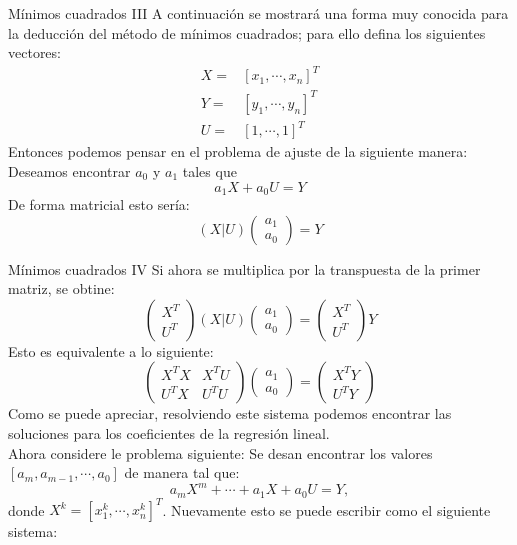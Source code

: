\begin{frame}{Mínimos cuadrados III}
\indent A continuación se mostrará una forma muy conocida para la deducción del método de mínimos cuadrados; para ello defina los siguientes vectores:
\begin{align*}
X=&[x_1,\cdots,x_n]^T\\
Y=&[y_1,\cdots,y_n]^T\\
U=&[1,\cdots,1]^T
\end{align*}
\indent Entonces podemos pensar en el problema de ajuste de la siguiente manera: Deseamos encontrar $a_0$ y $a_1$ tales que
$$a_1X+a_0U=Y$$
De forma matricial esto sería:
\begin{displaymath}
(X|U)
\left(
\begin{array}{c}
a_1\\
a_0
\end{array}
\right)=Y
\end{displaymath}
\end{frame}
\begin{frame}{Mínimos cuadrados IV}
\indent Si ahora se multiplica por la transpuesta de la primer matriz, se obtine:
\begin{displaymath}
\left(
\begin{array}{c}
X^T\\
U^T
\end{array}
\right)
(X|U)
\left(
\begin{array}{c}
a_1\\
a_0
\end{array}
\right)=
\left(
\begin{array}{c}
X^T\\
U^T
\end{array}
\right)
Y
\end{displaymath}
\indent Esto es equivalente a lo siguiente:
\begin{displaymath}
\left(
\begin{array}{cc}
X^TX &X^TU\\
U^TX & U^TU
\end{array}
\right)
\left(
\begin{array}{c}
a_1\\
a_0
\end{array}
\right)=
\left(
\begin{array}{c}
X^TY\\
U^TY
\end{array}
\right)
\end{displaymath}
\indent Como se puede apreciar, resolviendo este sistema podemos encontrar las soluciones para los coeficientes de la regresión lineal. \\
\indent Ahora considere le problema siguiente: Se desan encontrar los valores $[a_m,a_{m-1},\cdots,a_0]$ de manera tal que:
$$a_mX^m+\cdots+a_1X+a_0U=Y,$$
\indent donde $X^k=[x_1^k,\cdots,x_n^k]^T$. Nuevamente esto se puede escribir como el siguiente sistema:
\end{frame}
